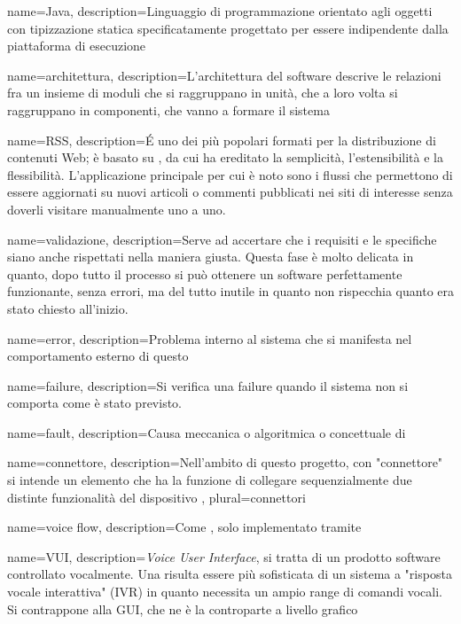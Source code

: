 {
	name=Java,
	description={Linguaggio di programmazione orientato agli oggetti con tipizzazione statica specificatamente progettato per essere indipendente dalla piattaforma di esecuzione}
}

{
	name=architettura,
	description={L’architettura del software descrive le relazioni fra un insieme di moduli che si raggruppano in unità, che a loro volta si raggruppano in componenti, che vanno a formare il sistema}
}

{
	name=RSS,
	description={\'E uno dei più popolari formati per la distribuzione di contenuti Web; è basato su , da cui ha ereditato la semplicità, l'estensibilità e la flessibilità. L'applicazione principale per cui è noto sono i flussi che permettono di essere aggiornati su nuovi articoli o commenti pubblicati nei siti di interesse senza doverli visitare manualmente uno a uno.}
}

{
	name=validazione,
	description={Serve ad accertare che i requisiti e le specifiche siano anche rispettati nella maniera giusta. Questa fase è molto delicata in quanto, dopo tutto il processo si può ottenere un software perfettamente funzionante, senza errori, ma del tutto inutile in quanto non rispecchia quanto era stato chiesto all'inizio.}
}

{
	name=error,
	description={Problema interno al sistema che si manifesta nel comportamento esterno di questo}
}

{
	name=failure,
	description={Si verifica una failure quando il sistema non si comporta come è stato previsto.}
}

{
	name=fault,
	description={Causa meccanica o algoritmica o concettuale di }
}

{
	name=connettore,
	description={Nell'ambito di questo progetto, con "connettore" si intende un elemento che ha la funzione di collegare sequenzialmente due distinte funzionalità del dispositivo  },
	plural=connettori
}

{
	name=voice flow,
	description={Come , solo implementato tramite }
}

{
	name=VUI,
	description={\emph{Voice User Interface}, si tratta di un prodotto software controllato vocalmente. Una  risulta essere più sofisticata di un sistema a "risposta vocale interattiva" (IVR) in quanto necessita un ampio range di comandi vocali. Si contrappone alla GUI, che ne è la controparte a livello grafico}
}


